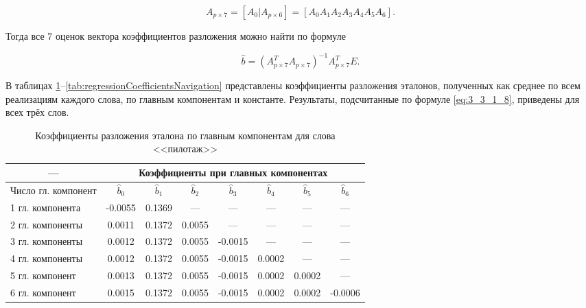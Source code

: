 \begin{equation}
A_{p \times 7} = [A_0 | A_{p \times 6}] = [A_0 A_1 A_2 A_3 A_4 A_5 A_6].
\end{equation}

Тогда все 7 оценок вектора коэффициентов разложения можно найти по формуле

\begin{equation} \label{eq:3_3_1_8}
\widehat{b} = (A_{p \times 7}^T A_{p \times 7})^{-1} A_{p \times 7}^T E.
\end{equation}

В таблицах \ref{tab:regressionCoefficientsPilotage}--\ref{tab:regressionCoefficientsNavigation} представлены коэффициенты разложения эталонов, полученных как среднее по всем реализациям каждого слова, по главным компонентам и константе.
Результаты, подсчитанные по формуле \eqref{eq:3_3_1_8}, приведены для всех трёх слов.

\begin{table}[h]
	\centering
	\caption{Коэффициенты разложения эталона по главным компонентам для слова <<пилотаж>>}
	\label{tab:regressionCoefficientsPilotage}
	\begin{tabular}{| l | c | c | c | c | c | c | c |}
		\hline
		\multicolumn{1}{|c|}{---} & \multicolumn{7}{c|}{Коэффициенты при главных компонентах} \\
		\hline
		Число гл. компонент & $\widehat{b}_0$ & $\widehat{b}_1$ & $\widehat{b}_2$ & $\widehat{b}_3$ & $\widehat{b}_4$ & $\widehat{b}_5$ & $\widehat{b}_6$ \\
		\hline
		1 гл. компонента & -0.0055 & 0.1369 & \multicolumn{1}{c|}{---} & \multicolumn{1}{c|}{---} & \multicolumn{1}{c|}{---} & \multicolumn{1}{c|}{---} & \multicolumn{1}{c|}{---} \\
		2 гл. компоненты &  0.0011 & 0.1372 & 0.0055 & \multicolumn{1}{c|}{---} & \multicolumn{1}{c|}{---} & \multicolumn{1}{c|}{---} & \multicolumn{1}{c|}{---} \\
		3 гл. компоненты &  0.0012 & 0.1372 & 0.0055 & -0.0015 & \multicolumn{1}{c|}{---} & \multicolumn{1}{c|}{---} & \multicolumn{1}{c|}{---} \\
		4 гл. компоненты &  0.0012 & 0.1372 & 0.0055 & -0.0015 & 0.0002 & \multicolumn{1}{c|}{---} & \multicolumn{1}{c|}{---} \\
		5 гл. компонент  &  0.0013 & 0.1372 & 0.0055 & -0.0015 & 0.0002 & 0.0002 & \multicolumn{1}{c|}{---} \\
		6 гл. компонент  &  0.0015 & 0.1372 & 0.0055 & -0.0015 & 0.0002 & 0.0002 & -0.0006 \\
		\hline
	\end{tabular}
\end{table}

